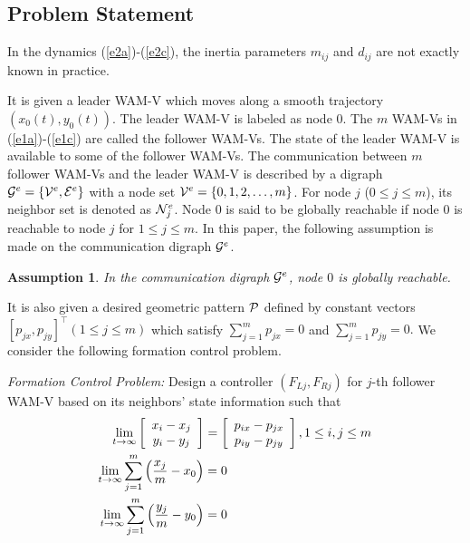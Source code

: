 \documentclass[letterpaper, 10 pt, conference]{ieeeconf}  %
\newtheorem{assumption}{Assumption}
\begin{document}
\subsection{Problem Statement}


In the dynamics (\ref{e2a})-(\ref{e2c}), the inertia parameters $m_{ij}$ and $d_{ij}$ are not exactly known in practice. 

It is given a leader WAM-V which moves along a smooth trajectory $(x_0(t),y_0(t))$.
The leader WAM-V is labeled as node $0$. The $m$ WAM-Vs in (\ref{e1a})-(\ref{e1c}) are called the follower WAM-Vs.
The state of the leader WAM-V is available to some of the follower WAM-Vs. The communication between $m$ follower WAM-Vs and the leader WAM-V is described by a digraph ${\cal G}^e=\{{\cal V}^e,{\cal E}^e\}$ with a node set ${\cal V}^e=\{0,1,2,\ldots,m\}$. For node $j$ ($0\leq j\leq m$), its neighbor set is denoted as ${\cal N}_j^e$.  Node $0$ is said to be globally reachable if node $0$ is reachable to node $j$ for $1\leq j\leq m$. In this paper, the following assumption is made on the communication digraph ${\cal G}^e$.

\begin{assumption}
In the communication digraph ${\cal G}^e$, node $0$ is globally reachable.
\label{ass1}
\end{assumption}

It is also given a desired geometric pattern ${\cal P}$ defined by constant
vectors $[p_{jx},p_{jy}]^\top (1\leq j\leq m)$ which satisfy
$ \sum^m_{j=1}p_{jx}=0$ and $\sum^m_{j=1}p_{jy}=0.$
We consider the following formation control problem.


{\em Formation Control Problem:} Design a controller $(F_{Lj},F_{Rj})$ for $j$-th follower WAM-V
based on its neighbors' state information such that
\begin{eqnarray}
\lim_{t\rightarrow\infty}\left[\begin{array}{c} x_i-x_j\\
y_i-y_j\end{array}\right]=\left[\begin{array}{c}
p_{ix}-p_{jx}\\
p_{iy}-p_{jy}\end{array}\right], 1\leq i,j\leq m \label{goal1}\\
\lim_{t\rightarrow\infty}\sum^m_{j=1}\left(\frac{x_j}{m}-x_0\right)=0\makebox[4cm]{}\label{goal2}\\
\lim_{t\rightarrow\infty}\sum^m_{j=1}\left(\frac{y_j}{m}-y_0\right)=0\makebox[4cm]{}\label{goal3}
\end{eqnarray}
\end{document}
